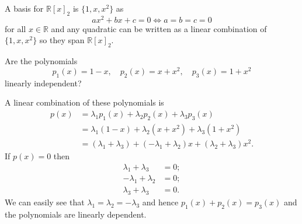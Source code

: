 \begin{example}
    A basis for $\mathbb{R}[x]_2$ is $\{1, x, x^2\}$ as \[ax^2 + bx + c = 0 \iff a = b = c = 0\] for all $x \in \mathbb{R}$ and any quadratic can be written as a linear combination of $\{1, x, x^2\}$ so they span $\mathbb{R}[x]_2$.
\end{example}

\begin{example}
    Are the polynomials \[p_1(x) = 1 - x, \quad p_2(x) = x + x^2, \quad p_3(x) = 1 + x^2\] linearly independent? 
    
    A linear combination of these polynomials is
    \begin{align*}
        p(x) &= \lambda_1 p_1(x) + \lambda_2 p_2(x) + \lambda_3 p_3(x) \\
        &= \lambda_1 (1 - x) + \lambda_2 (x + x^2) + \lambda_3 (1 + x^2) \\
        &= (\lambda_1 + \lambda_3) + (-\lambda_1 + \lambda_2) x + (\lambda_2 + \lambda_3)x^2.
    \end{align*}
    If $p(x) = 0$ then
    \begin{align*}
        \lambda_1 + \lambda_3 &= 0; \\
        -\lambda_1 + \lambda_2 &= 0;\\
        \lambda_3 + \lambda_3 &= 0.
    \end{align*}
    We can easily see that $\lambda_1 = \lambda_2 = -\lambda_3$ and hence $p_1(x) + p_2(x) = p_3(x)$ and the polynomials are linearly dependent.
\end{example}

